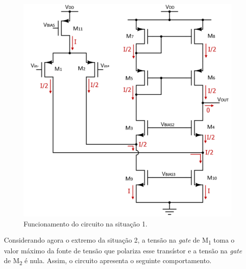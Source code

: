 \documentclass[11pt]{article}
\numberwithin{equation}{section}
\begin{document}
\begin{figure}[H]
	\centering
	\includegraphics[keepaspectratio=true, scale=0.50]{teoricas/situacao1}
	\vspace{-0.5em}
	\caption{Funcionamento do circuito na situação 1.}
	\vspace{-0.8em}
\end{figure} 

Considerando agora o extremo da situação 2, a tensão na \textit{gate} de M\textsubscript{1} toma o valor máximo da fonte de tensão que polariza esse transístor e a tensão na \textit{gate} de M\textsubscript{2} é nula. Assim, o circuito apresenta o seguinte comportamento.
\end{document}

